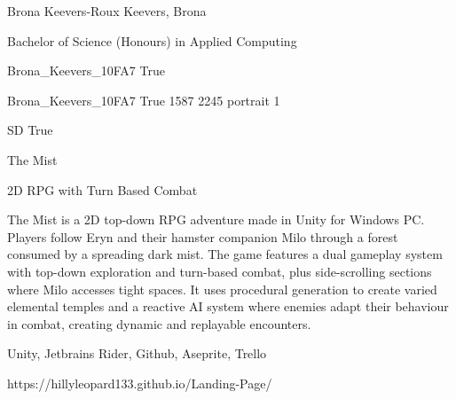 \documentclass[twoside]{report}
\begin{document}
\begingroup{}\relax



\def\Key{Brona_Keevers_10FA7}

{Brona Keevers-Roux}
{Keevers, Brona}

{Bachelor of Science (Honours) in Applied Computing}

{Brona_Keevers_10FA7}
{True}

{Brona_Keevers_10FA7}
{True}
{1587}
{2245}
{portrait}
{1}

{SD}
{True}

{The Mist}

{2D RPG with Turn Based Combat}

{The Mist is a 2D top-down RPG adventure made in Unity for Windows PC. Players follow Eryn and their hamster companion Milo through a forest consumed by a spreading dark mist. The game features a dual gameplay system with top-down exploration and turn-based combat, plus side-scrolling sections where Milo accesses tight spaces. It uses procedural generation to create varied elemental temples and a reactive AI system where enemies adapt their behaviour in combat, creating dynamic and replayable encounters.}

{Unity, Jetbrains Rider, Github, Aseprite, Trello}

{https://hillyleopard133.github.io/Landing-Page/}
\end{document}
